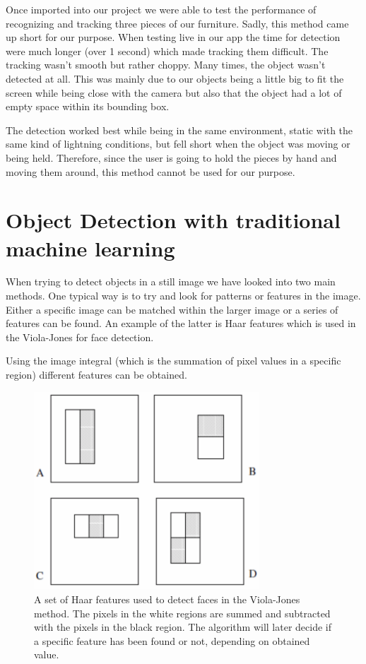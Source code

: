 Once imported into our project we were able to test the performance of recognizing and tracking three pieces of our furniture.
Sadly, this method came up short for our purpose. When testing live in our app the time for detection were much longer (over 1 second) which made tracking them difficult. The tracking wasn't smooth but rather choppy. Many times, the object wasn't detected at all. This was mainly due to our objects being a little big to fit the screen while being close with the camera but also that the object had a lot of empty space within its bounding box.

The detection worked best while being in the same environment, static with the same kind of lightning conditions, but fell short when the object was moving or being held. Therefore, since the user is going to hold the pieces by hand and moving them around, this method cannot be used for our purpose.


\section{Object Detection with traditional machine learning}
\label{sec:ODtrad}

When trying to detect objects in a still image we have looked into two main methods. One typical way is to try and look for patterns or features in the image.
Either a specific image can be matched within the larger image or a series of features can be found.
An example of the latter is Haar features which is used in the Viola-Jones for face detection.

Using the image integral (which is the summation of pixel values in a specific region) different features can be obtained.

\begin{figure}[hbtp]
\begin{center}
\includegraphics[width = 0.75\textwidth]{./Images/viola-jones.jpg} 
\caption{A set of Haar features used to detect faces in the Viola-Jones method. The pixels in the white regions are summed and subtracted with the pixels in the black region. The algorithm will later decide if a specific feature has been found or not, depending on obtained value.}
\end{center}
\end{figure}


